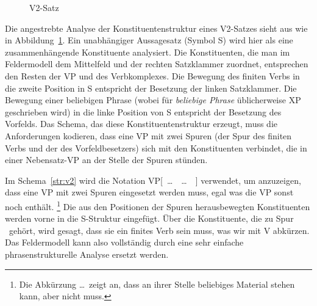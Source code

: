\begin{figure}[!htbp]
  \caption{V2-Satz}
  \label{fig:v2satz}
\end{figure}



Die angestrebte Analyse der Konstituentenstruktur eines V2-Satzes sieht aus wie in Abbildung~\ref{fig:v2satz}.
Ein unabhängiger Aussagesatz (Symbol S) wird hier als eine zusammenhängende Konstituente analysiert.
Die Konstituenten, die man im Feldermodell dem Mittelfeld und der rechten Satzklammer zuordnet, entsprechen den Resten der VP und des Verbkomplexes.
Die Bewegung des finiten Verbs in die zweite Position in S entspricht der Besetzung der linken Satzklammer.
Die Bewegung einer beliebigen Phrase (wobei für \textit{beliebige Phrase} üblicherweise XP geschrieben wird) in die linke Position von S entspricht der Besetzung des Vorfelds.
Das Schema, das diese Konstituentenstruktur erzeugt, muss die Anforderungen kodieren, dass eine VP mit zwei Spuren (der Spur des finiten Verbs und der des Vorfeldbesetzers) sich mit den Konstituenten verbindet, die in einer Nebensatz-VP an der Stelle der Spuren stünden.



Im Schema~\ref{str:v2} wird die Notation VP[~\ldots~\Tii~\ldots~\Ti~] verwendet, um anzuzeigen, dass eine VP mit zwei Spuren eingesetzt werden muss, egal was die VP sonst noch enthält.%
\footnote{Die Abkürzung \ldots\ zeigt an, dass an ihrer Stelle beliebiges Material stehen kann, aber nicht muss.}
Die aus den Positionen der Spuren herausbewegten Konstituenten werden vorne in die S-Struktur eingefügt.
Über die Konstituente, die zu Spur \Ti\ gehört, wird gesagt, dass sie ein finites Verb sein muss, was wir mit V abkürzen.
Das Feldermodell kann also vollständig durch eine sehr einfache phrasenstrukturelle Analyse ersetzt werden.

